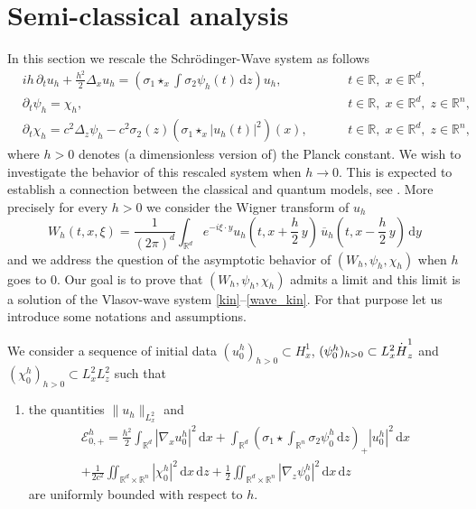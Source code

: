 \documentclass[11pt]{article}
\let\oldbar\bar\let\oldhat\hat\let\oldtilde\tilde
\let\bar\oldbar
\let\hat\oldhat
\let\tilde\oldtilde
\DeclareRobustCommand{\accentset}[2]{\overset{#1}{#2}}
\theoremstyle{definition}
\newcommand*{\overbigdot}[1]{%
\accentset{\mbox{\large\bfseries .}}{#1}}
\let\bar\overline
\let\hat\widehat
\let\tilde\widetilde
\newcommand{\R}{\mathbb{R}}
\let\ds\displaystyle
\newcommand{\ud}{\, {\mathrm{d}}}
\begin{document}
\section{Semi-classical analysis}\label{SClassicalAnalysis}

In this section we rescale the Schrödinger-Wave system as follows
\begin{subequations}
\begin{alignat}{11}
\label{schroh}&\ds ih\,\partial_{t}u_{h}+\frac{h^{2}}{2}\Delta_{x}u_{h}=\left(\sigma_{1}\star_{x}\int\sigma_{2}\psi_{h}(t)\ud z\right)u_{h},&\hspace{1cm}t\in\R,\;x\in\R^{d},\\
\label{wave1_schroh}&\ds \partial_{t}\psi_{h}=\chi_{h},&\hspace{1cm}t\in\R,\;x\in\R^{d},\;z\in\R^{n},\\
\label{wave2_schroh}&\ds \partial_{t}\chi_{h}=c^{2}\Delta_{z}\psi_{h}-c^{2}\sigma_{2}(z)\left(\sigma_{1}\star_{x}|u_{h}(t)|^{2}\right)(x),&\hspace{1cm}t\in\R,\;x\in\R^{d},\;z\in\R^{n},
\end{alignat}
\end{subequations}
where $h>0$ denotes (a dimensionless version of) the Planck constant.
We wish to investigate the behavior of this rescaled system when $h\to 0$. This is expected to establish a connection between the classical and quantum models, see \cite{Lions_Paul_Wigner}. More precisely for every $h>0$ we consider the Wigner transform of $u_{h}$
\[
W_{h}(t,x,\xi)=\frac{1}{(2\pi)^{d}}\int_{\R^{d}}e^{-i\xi\cdot y}u_{h}(t,x+\frac{h}{2}\,y)\,\bar{u}_{h}(t,x-\frac{h}{2}\,y)\ud y
\]
and we address the question of the asymptotic behavior of $(W_{h},\psi_{h},\chi_{h})$ when $h$ goes to $0$. Our goal is to prove that $(W_{h},\psi_{h},\chi_{h})$ admits a limit and this limit is a solution of the Vlasov-wave system \eqref{kin}--\eqref{wave_kin}. For that purpose let us introduce some notations and assumptions.

We consider a sequence of initial data $(u_{0}^{h})_{h>0}\subset H_{x}^{1}$, $(\psi_{0}^{h})_{h>0}\subset L_{x}^{2}\overbigdot{H}_{z}^{1}$ and $(\chi_{0}^{h})_{h>0}\subset L_{x}^{2}L_{z}^{2}$ such that

\begin{enumerate}\renewcommand{\theenumi}{H\arabic{enumi}}\setcounter{enumi}{4}
\item\label{h5}
the quantities $\|u_{h}\|_{L_{x}^{2}}$ and
\begin{multline*}
\mathscr{E}_{0,+}^{h}=\frac{h^{2}}{2}\int_{\R^{d}}|\nabla_{x}u_{0}^{h}|^{2}\ud x+\int_{\R^{d}}\left(\sigma_{1}\star\int_{\R^{n}}\sigma_{2}\psi_{0}^{h}\ud z\right)_{+}|u_{0}^{h}|^{2}\ud x\\
+\frac{1}{2c^{2}}\iint_{\R^{d}\times\R^{n}}|\chi_{0}^{h}|^{2}\ud x\ud z+\frac{1}{2}\iint_{\R^{d}\times\R^{n}}|\nabla_{z}\psi_{0}^{h}|^{2}\ud x\ud z
\end{multline*}
are uniformly bounded with respect to $h$.
\end{enumerate}
\end{document}

